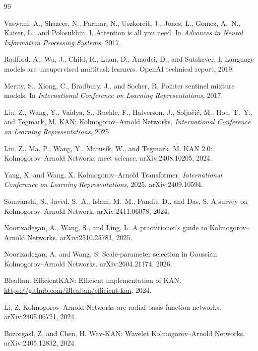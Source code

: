 \documentclass[11pt]{article}
\begin{document}
\begin{thebibliography}{99}

Vaswani, A., Shazeer, N., Parmar, N., Uszkoreit, J., Jones, L., Gomez, A.~N., Kaiser, L., and Polosukhin, I. Attention is all you need. In \emph{Advances in Neural Information Processing Systems}, 2017.

Radford, A., Wu, J., Child, R., Luan, D., Amodei, D., and Sutskever, I. Language models are unsupervised multitask learners. OpenAI technical report, 2019.

Merity, S., Xiong, C., Bradbury, J., and Socher, R. Pointer sentinel mixture models. In \emph{International Conference on Learning Representations}, 2017.

Liu, Z., Wang, Y., Vaidya, S., Ruehle, F., Halverson, J., Solja\v{c}i\'{c}, M., Hou, T.~Y., and Tegmark, M. KAN: Kolmogorov--Arnold Networks. \emph{International Conference on Learning Representations}, 2025.

Liu, Z., Ma, P., Wang, Y., Matusik, W., and Tegmark, M. KAN 2.0: Kolmogorov--Arnold Networks meet science. arXiv:2408.10205, 2024.

Yang, X. and Wang, X. Kolmogorov--Arnold Transformer. \emph{International Conference on Learning Representations}, 2025. arXiv:2409.10594.

Somvanshi, S., Javed, S.~A., Islam, M.~M., Pandit, D., and Das, S. A survey on Kolmogorov--Arnold Network. arXiv:2411.06078, 2024.

Noorizadegan, A., Wang, S., and Ling, L. A practitioner's guide to Kolmogorov--Arnold Networks. arXiv:2510.25781, 2025.

Noorizadegan, A. and Wang, S. Scale-parameter selection in Gaussian Kolmogorov--Arnold Networks. arXiv:2604.21174, 2026.

Blealtan. EfficientKAN: Efficient implementation of KAN. \url{https://github.com/Blealtan/efficient-kan}, 2024.

Li, Z. Kolmogorov--Arnold Networks are radial basis function networks. arXiv:2405.06721, 2024.

Bozorgasl, Z. and Chen, H. Wav-KAN: Wavelet Kolmogorov--Arnold Networks. arXiv:2405.12832, 2024.


\end{thebibliography}
\end{document}

